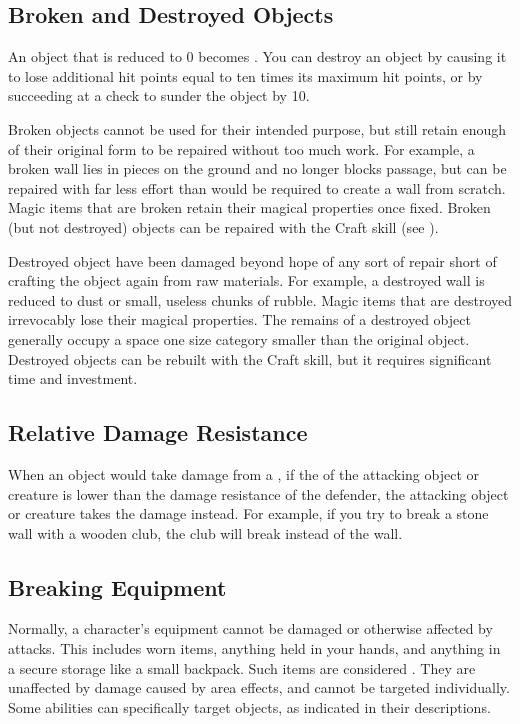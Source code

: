   \subsection{Broken and Destroyed Objects}\label{Broken and Destroyed Objects}
    An object that is reduced to 0  becomes .
    You can destroy an object by causing it to lose additional hit points equal to ten times its maximum hit points, or by succeeding at a check to sunder the object by 10.

    Broken objects cannot be used for their intended purpose, but still retain enough of their original form to be repaired without too much work.
    For example, a broken wall lies in pieces on the ground and no longer blocks passage, but can be repaired with far less effort than would be required to create a wall from scratch.
    Magic items that are broken retain their magical properties once fixed.
    Broken (but not destroyed) objects can be repaired with the Craft skill (see ).

    Destroyed object have been damaged beyond hope of any sort of repair short of crafting the object again from raw materials.
    For example, a destroyed wall is reduced to dust or small, useless chunks of rubble.
    Magic items that are destroyed irrevocably lose their magical properties.
    The remains of a destroyed object generally occupy a space one size category smaller than the original object.
    Destroyed objects can be rebuilt with the Craft skill, but it requires significant time and investment.

  \subsection{Relative Damage Resistance}\label{Relative Damage Resistance}
    When an object would take damage from a , if the  of the attacking object or creature is lower than the damage resistance of the defender, the attacking object or creature takes the damage instead.
    For example, if you try to break a stone wall with a wooden club, the club will break instead of the wall.

  \subsection{Breaking Equipment}\label{Breaking Equipment}
    Normally, a character's equipment cannot be damaged or otherwise affected by attacks.
    This includes worn items, anything held in your hands, and anything in a secure storage like a small backpack.
    Such items are considered .
    They are unaffected by damage caused by area effects, and cannot be targeted individually.
    Some abilities can specifically target  objects, as indicated in their descriptions.

